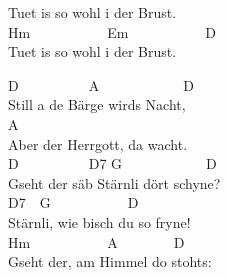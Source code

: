 \documentclass[
  letterpaper,
  twoside=false]{scrbook}
\begin{document}
Tuet is so wohl i der Brust.\\
Hm~~~~~~~~~~~Em~~~~~~~~~~~D\\
Tuet is so wohl i der Brust.

D~~~~~~~~~~A~~~~~~~~~~~~D\\
Still a de Bärge wird\textquotesingle s Nacht,\\
\hspace*{0.333em}\hspace*{0.333em}\hspace*{0.333em}\hspace*{0.333em}\hspace*{0.333em}\hspace*{0.333em}\hspace*{0.333em}\hspace*{0.333em}\hspace*{0.333em}\hspace*{0.333em}\hspace*{0.333em}\hspace*{0.333em}\hspace*{0.333em}\hspace*{0.333em}\hspace*{0.333em}\hspace*{0.333em}\hspace*{0.333em}\hspace*{0.333em}\hspace*{0.333em}\hspace*{0.333em}\hspace*{0.333em}\hspace*{0.333em}A\\
Aber der Herrgott, da wacht.\\
D~~~~~~~~~~D7 G~~~~~~~~~~~~D\\
Gseht der säb Stärnli dört schyne?\\
\hspace*{0.333em}\hspace*{0.333em}\hspace*{0.333em}\hspace*{0.333em}\hspace*{0.333em}\hspace*{0.333em}\hspace*{0.333em}\hspace*{0.333em}\hspace*{0.333em}D7~~G~~~~~~~~~~~D\\
Stärnli, wie bisch du so fryne!\\
Hm~~~~~~~~~~~A~~~~~~~~D\\
Gseht der, am Himmel do stoht\textquotesingle s:\\
\end{document}
